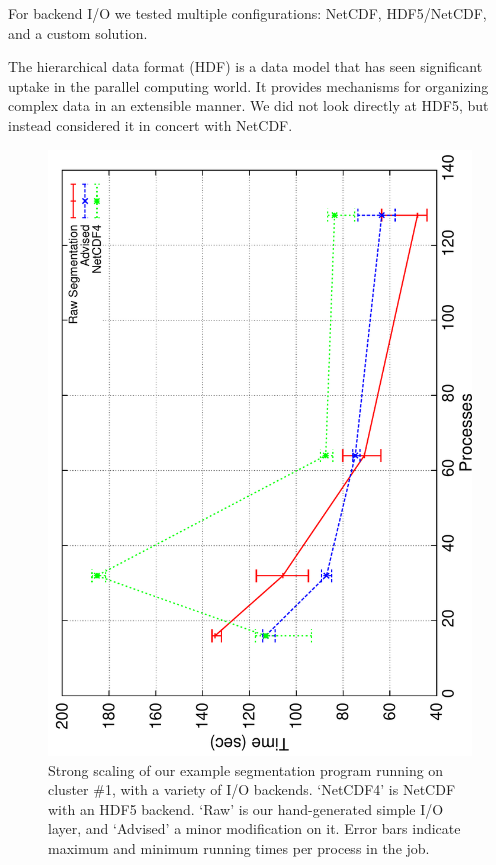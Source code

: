 For backend I/O we tested multiple configurations: NetCDF, HDF5/NetCDF,
and a custom solution.

The hierarchical data format (HDF) is a data model that has seen
significant uptake in the parallel computing world.  It provides
mechanisms for organizing complex data in an extensible manner.  We did
not look directly at HDF5, but instead considered it in concert with
NetCDF.

\begin{figure}
  \centering
  \includegraphics[angle=270,width=\linewidth]{images/io/lens-most}
  \caption{Strong scaling of our example segmentation program running
  on cluster \#1, with a variety of I/O backends.  `NetCDF4' is NetCDF
  with an HDF5 backend.  `Raw' is our hand-generated simple I/O layer,
  and `Advised' a minor modification on it.  Error bars indicate
  maximum and minimum running times per process in the job.}
  \label{fig:lens-most}
\end{figure}

